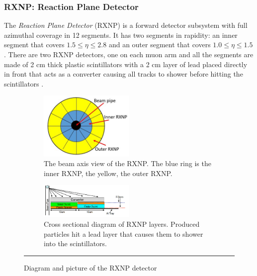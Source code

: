 \subsubsection{RXNP: Reaction Plane Detector}
The \textit{Reaction Plane Detector} (RXNP) is a forward detector subsystem \citep{RXNPfocus} with full azimuthal coverage in 12 segments. It has two segments in rapidity: an inner segment that covers $1.5 \leq \eta \leq 2.8$ and an outer segment that covers $1.0 \leq \eta \leq 1.5$. There are two RXNP detectors, one on each muon arm and all the segments are made of 2 cm thick plastic scintillators with a 2 cm layer of lead placed directly in front that acts as a converter causing all tracks to shower before hitting the scintillators \citep{RXNPfocusER}.  
\begin{figure}
\begin{subfigure}[b]{1\textwidth}
    \centering
    \includegraphics[width=0.5\textwidth]{Figures/RXNPdiagram.JPG}
    \caption{The beam axis view of the RXNP. The blue ring is the inner RXNP, the yellow, the outer RXNP.}

\end{subfigure}
\begin{subfigure}[b]{1\textwidth}
\centering
  \includegraphics[width=0.5\textwidth]{Figures/RXNPschem.jpg}
  \caption{Cross sectional diagram of RXNP layers. Produced particles hit a lead layer that causes them to shower into the scintillators.}
\end{subfigure}

  \rule{35em}{0.5pt}
\caption[Diagram and picture of the RXNP detector]{Diagram and picture of the RXNP detector}
      \label{fig:RXNP}
\end{figure}


